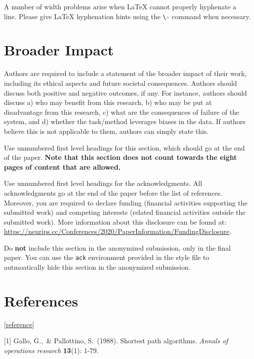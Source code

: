 \documentclass{article}
\begin{document}
A number of width problems arise when \LaTeX{} cannot properly hyphenate a
line. Please give LaTeX hyphenation hints using the \verb+\-+ command when
necessary.


\section*{Broader Impact}

Authors are required to include a statement of the broader impact of their work, including its ethical aspects and future societal consequences. 
Authors should discuss both positive and negative outcomes, if any. For instance, authors should discuss a) 
who may benefit from this research, b) who may be put at disadvantage from this research, c) what are the consequences of failure of the system, and d) whether the task/method leverages
biases in the data. If authors believe this is not applicable to them, authors can simply state this.

Use unnumbered first level headings for this section, which should go at the end of the paper. {\bf Note that this section does not count towards the eight pages of content that are allowed.}

\begin{ack}
Use unnumbered first level headings for the acknowledgments. All acknowledgments
go at the end of the paper before the list of references. Moreover, you are required to declare 
funding (financial activities supporting the submitted work) and competing interests (related financial activities outside the submitted work). 
More information about this disclosure can be found at: \url{https://neurips.cc/Conferences/2020/PaperInformation/FundingDisclosure}.


Do {\bf not} include this section in the anonymized submission, only in the final paper. You can use the \texttt{ack} environment provided in the style file to autmoatically hide this section in the anonymized submission.
\end{ack}


\section*{References}
\ref{reference}
\small

[1] Gallo, G.,\ \& Pallottino, S.\ (1988). Shortest path algorithms. {\it Annals 
  of operations research} {\bf 13}(1): 1-79.
\end{document}
